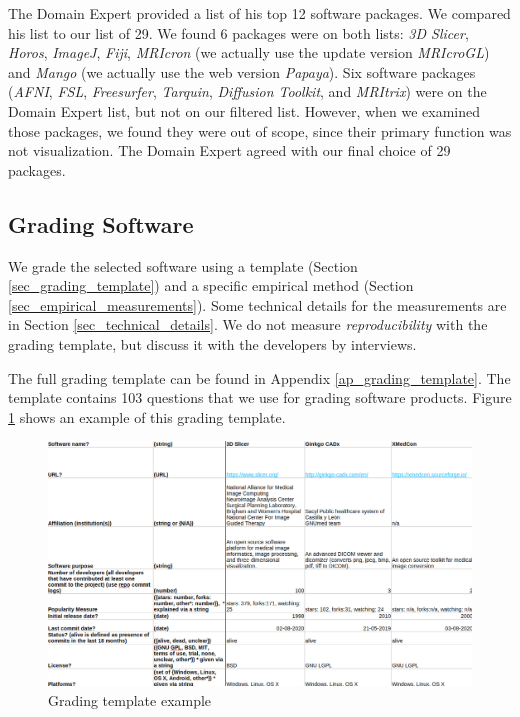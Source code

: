 \documentclass[3p, 12pt,authoryear]{elsarticle}
\begin{document}
The Domain Expert provided a list of his top 12 software packages.  We compared
his list to our list of 29.  We found 6 packages were on both lists: \textit{3D
Slicer}, \textit{Horos}, \textit{ImageJ}, \textit{Fiji}, \textit{MRIcron} (we
actually use the update version \textit{MRIcroGL}) and \textit{Mango} (we
actually use the web version \textit{Papaya}).  Six software packages
(\textit{AFNI}, \textit{FSL}, \textit{Freesurfer}, \textit{Tarquin},
\textit{Diffusion Toolkit}, and \textit{MRItrix}) were on the Domain Expert
list, but not on our filtered list.  However, when we examined those packages,
we found they were out of scope, since their primary function was not
visualization.  The Domain Expert agreed with our final choice of 29 packages.

\subsection{Grading Software} \label{sec_grading_software}

We grade the selected software using a template (Section
\ref{sec_grading_template}) and a specific empirical method (Section
\ref{sec_empirical_measurements}). Some technical details for the measurements
are in Section \ref{sec_technical_details}.  We do not measure
\textit{reproducibility} with the grading template, but discuss it with the
developers by interviews.

The full grading template can be found in Appendix \ref{ap_grading_template}.
The template contains 103 questions that we use for grading software products.
Figure \ref{fg_grading_template_example} shows an example of this grading
template.

\begin{figure}[ht]
\includegraphics[scale=0.42]{figures/template.png}
\caption{Grading template example}
\label{fg_grading_template_example}
\end{figure}
\end{document}
